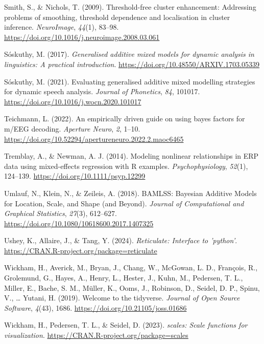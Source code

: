 \documentclass[
  doc,
  floatsintext,
  longtable,
  a4paper,
  nolmodern,
  notxfonts,
  notimes,
  colorlinks=true,linkcolor=blue,citecolor=blue,urlcolor=blue]{apa7}
\newlength{\cslhangindent}
\newenvironment{CSLReferences}[2] %
 {\begin{list}{}{%
  \setlength{\itemindent}{0pt}
  \setlength{\leftmargin}{0pt}
  \setlength{\parsep}{0pt}
  \ifodd #1
   \setlength{\leftmargin}{\cslhangindent}
   \setlength{\itemindent}{-1\cslhangindent}
  \fi
  \setlength{\itemsep}{#2\baselineskip}}}
 {\end{list}}
\begin{document}
\begin{CSLReferences}{1}{0}
Smith, S., \& Nichols, T. (2009). Threshold-free cluster enhancement:
Addressing problems of smoothing, threshold dependence and localisation
in cluster inference. \emph{NeuroImage}, \emph{44}(1), 83--98.
\url{https://doi.org/10.1016/j.neuroimage.2008.03.061}

Sóskuthy, M. (2017). \emph{Generalised additive mixed models for dynamic
analysis in linguistics: A practical introduction}.
\url{https://doi.org/10.48550/ARXIV.1703.05339}

Sóskuthy, M. (2021). Evaluating generalised additive mixed modelling
strategies for dynamic speech analysis. \emph{Journal of Phonetics},
\emph{84}, 101017. \url{https://doi.org/10.1016/j.wocn.2020.101017}

Teichmann, L. (2022). An empirically driven guide on using bayes factors
for m/EEG decoding. \emph{Aperture Neuro}, \emph{2}, 1--10.
\url{https://doi.org/10.52294/apertureneuro.2022.2.maoc6465}

Tremblay, A., \& Newman, A. J. (2014). Modeling nonlinear relationships
in ERP data using mixed{-}effects regression with R examples.
\emph{Psychophysiology}, \emph{52}(1), 124--139.
\url{https://doi.org/10.1111/psyp.12299}

Umlauf, N., Klein, N., \& Zeileis, A. (2018). BAMLSS: Bayesian Additive
Models for Location, Scale, and Shape (and Beyond). \emph{Journal of
Computational and Graphical Statistics}, \emph{27}(3), 612--627.
\url{https://doi.org/10.1080/10618600.2017.1407325}

Ushey, K., Allaire, J., \& Tang, Y. (2024). \emph{Reticulate: Interface
to 'python'}. \url{https://CRAN.R-project.org/package=reticulate}

Wickham, H., Averick, M., Bryan, J., Chang, W., McGowan, L. D.,
François, R., Grolemund, G., Hayes, A., Henry, L., Hester, J., Kuhn, M.,
Pedersen, T. L., Miller, E., Bache, S. M., Müller, K., Ooms, J.,
Robinson, D., Seidel, D. P., Spinu, V., \ldots{} Yutani, H. (2019).
Welcome to the {tidyverse}. \emph{Journal of Open Source Software},
\emph{4}(43), 1686. \url{https://doi.org/10.21105/joss.01686}

Wickham, H., Pedersen, T. L., \& Seidel, D. (2023). \emph{{scales}:
Scale functions for visualization}.
\url{https://CRAN.R-project.org/package=scales}


\end{CSLReferences}
\end{document}
